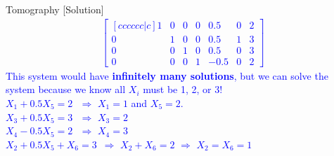 \begin{frame}{Tomography [Solution]}
    \textcolor{blue}{
        \begin{align*}
            \begin{bmatrix}[cccccc|c]
                1 & 0 & 0 & 0 & 0.5 & 0 & 2 \\
                0 & 1 & 0 & 0 & 0.5 & 1 & 3 \\
                0 & 0 & 1 & 0 & 0.5 & 0 & 3 \\
                0 & 0 & 0 & 1 & -0.5 & 0 & 2
            \end{bmatrix}
        \end{align*}
        This system would have \textbf{infinitely many solutions}, but we can solve the system because we know all $X_i$ must be 1, 2, or 3! \\[1.5ex]
        $X_1 + 0.5X_5 = 2$ \qquad $\,\,\Longrightarrow$ \quad $X_1 = 1$ and $X_5 = 2$. \\[0.5ex]
        $X_3 + 0.5X_5 = 3$ \qquad $\,\,\Longrightarrow$ \quad $X_3 = 2$ \\[0.5ex]
        $X_4 - 0.5X_5 = 2$ \qquad $\,\,\Longrightarrow$ \quad $X_4 = 3$ \\[0.5ex]
        $X_2 + 0.5X_5 + X_6 = 3$ $\,\Longrightarrow$ \quad $X_2 + X_6 = 2$ \quad $\Longrightarrow$ \quad $X_2 = X_6 = 1$
    }
\end{frame}

